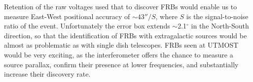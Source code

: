 Retention of the raw voltages used that to discover FRBs would enable us to measure East-West positional accuracy of $\sim 43''/S$, where $S$ is the signal-to-noise ratio of the event. Unfortunately the error box extends $\sim$2.1$^{\circ}$ in the North-South direction, so that the identification of FRBs with extragalactic sources would be almost as problematic as with single dish telescopes. FRBs seen at UTMOST would be very exciting, as the interferometer offers the chance to measure a source parallax, confirm their presence at lower frequencies, and substantially increase their discovery rate. 


    
